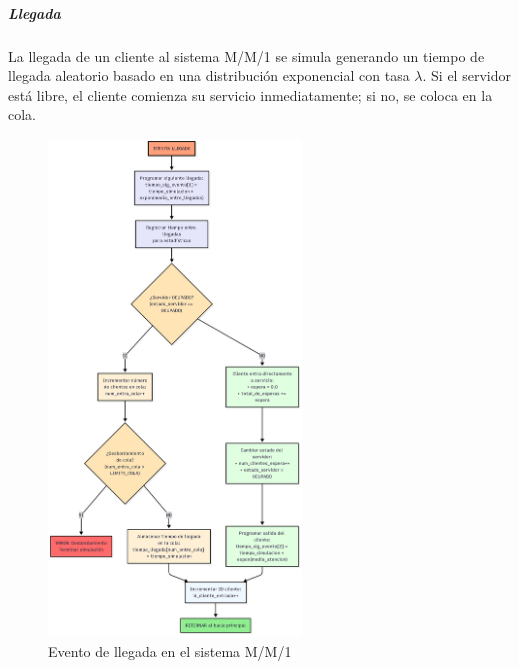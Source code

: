 \documentclass{article}
\begin{document}
\subparagraph{Llegada}
La llegada de un cliente al sistema M/M/1 se simula generando un tiempo de llegada aleatorio basado en una distribución exponencial con tasa $\lambda$. Si el servidor está libre, el cliente comienza su servicio inmediatamente; si no, se coloca en la cola.
\begin{figure}[H]
    \centering
    \includegraphics[width=0.6\textwidth]{images/flujos/MM1Llegada.png}
    \caption{Evento de llegada en el sistema M/M/1}
    \label{fig:mm1_llegada}
\end{figure}
\end{document}
